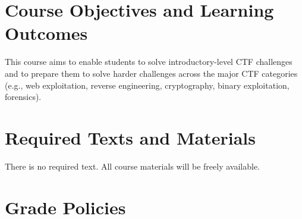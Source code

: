 \documentclass[11pt]{article}
\begin{document}
\begin{flushleft}
\section{Course Objectives and Learning Outcomes}\label{course-objectives-and-learning-outcomes}

This course aims to enable students to solve introductory-level CTF challenges and to prepare them to solve harder challenges across the major CTF categories (e.g., web exploitation, reverse engineering, cryptography, binary exploitation, forensics).



\section{Required Texts and Materials}\label{required-texts-and-materials}

There is no required text. All course materials will be freely available.


\section{Grade Policies}\label{grade-policies}


\end{flushleft}
\end{document}
